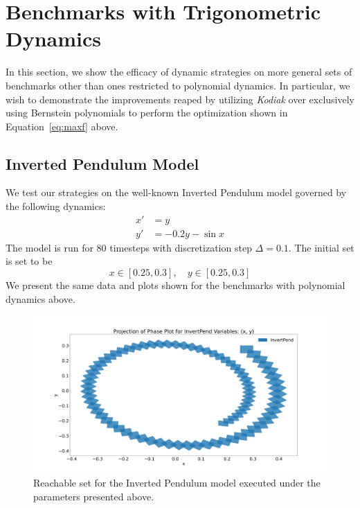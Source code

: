 \section{Benchmarks with Trigonometric Dynamics}
In this section, we show the efficacy of dynamic strategies on more general sets of benchmarks other than ones restricted to polynomial dynamics. In particular, we wish to demonstrate the improvements reaped by utilizing \emph{Kodiak} over exclusively using Bernstein polynomials to perform the optimization shown in Equation~\ref{eq:maxf} above.

\subsection{Inverted Pendulum Model}
We test our strategies on the well-known Inverted Pendulum model governed by the following dynamics:
\begin{align}
  x' & = y \\
  y' & = -0.2y - \sin{x}
\end{align}
The model is run for 80 timesteps with discretization step $\Delta=0.1$. The initial set is set to be
\[ x \in [0.25, 0.3], \quad y \in [0.25, 0.3] \]
%
We present the same data and plots shown for the benchmarks with polynomial dynamics above.

\begin{figure}[h!]
  \includegraphics[width=\textwidth, height=0.75\textwidth]{figures/InvertPend}
  \caption{Reachable set for the Inverted Pendulum model executed under the parameters presented above.}
\end{figure}
